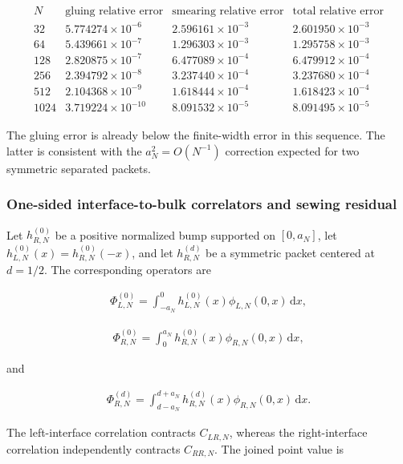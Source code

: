 \begin{align}
\begin{array}{c|c|c|c}
N&
\text{gluing relative error}&
\text{smearing relative error}&
\text{total relative error}\\ \hline
32&5.774274\times10^{-6}&2.596161\times10^{-3}&2.601950\times10^{-3}\\
64&5.439661\times10^{-7}&1.296303\times10^{-3}&1.295758\times10^{-3}\\
128&2.820875\times10^{-7}&6.477089\times10^{-4}&6.479912\times10^{-4}\\
256&2.394792\times10^{-8}&3.237440\times10^{-4}&3.237680\times10^{-4}\\
512&2.104368\times10^{-9}&1.618444\times10^{-4}&1.618423\times10^{-4}\\
1024&3.719224\times10^{-10}&8.091532\times10^{-5}&8.091495\times10^{-5}
\end{array}
\end{align}

The gluing error is already below the finite-width error in this sequence. The latter is consistent with the $a_N^2=O(N^{-1})$ correction expected for two symmetric separated packets.

\subsubsection{One-sided interface-to-bulk correlators and sewing residual}\label{subsubsec:one-sided}

Let $h_{R,N}^{(0)}$ be a positive normalized bump supported on $[0,a_N]$, let $h_{L,N}^{(0)}(x)=h_{R,N}^{(0)}(-x)$, and let $h_{R,N}^{(d)}$ be a symmetric packet centered at $d=1/2$. The corresponding operators are

\begin{align}
\Phi_{L,N}^{(0)}
=\int_{-a_N}^{0}h_{L,N}^{(0)}(x)\phi_{L,N}(0,x)\,\mathrm dx,
\end{align}

\begin{align}
\Phi_{R,N}^{(0)}
=\int_{0}^{a_N}h_{R,N}^{(0)}(x)\phi_{R,N}(0,x)\,\mathrm dx,
\end{align}

and

\begin{align}
\Phi_{R,N}^{(d)}
=\int_{d-a_N}^{d+a_N}h_{R,N}^{(d)}(x)\phi_{R,N}(0,x)\,\mathrm dx.
\end{align}

The left-interface correlation contracts $C_{LR,N}$, whereas the right-interface correlation independently contracts $C_{RR,N}$. The joined point value is


